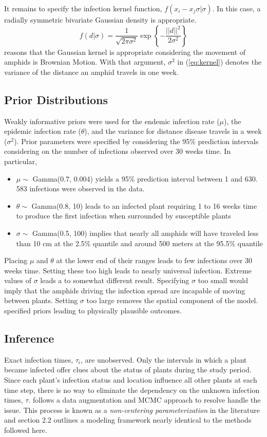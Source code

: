 \documentclass{uwstat572}
\begin{document}
It remains to specify the infection kernel function, $f(x_i -x_j \sigma | \sigma)$. In this case, a radially symmetric bivariate Gaussian density is appropriate. 
\begin{equation} f(d|\sigma) = \frac{1}{\sqrt{2\pi \sigma^2}} \exp \left\{-\frac{||d||^2}{2\sigma^2} \right\} \label{eq:kernel} \end{equation}
\cite{Brown} reasons that the Gaussian kernel is appropriate considering the movement of amphids is Brownian Motion. 
With that argument, $\sigma^2$ in (\ref{eq:kernel}) denotes the variance of the distance an amphid travels in one week. 

\subsection{Prior Distributions}
Weakly informative priors were used for the endemic infection rate ($\mu$), the epidemic infection rate ($\theta$), and the variance for distance disease travels in a week ($\sigma^2$). 
Prior parameters were specified by considering the 95\% prediction intervals considering on the number of infections observed over 30 weeks time.
In particular,  
\begin{itemize}
\item $\mu \sim$ Gamma(0.7, 0.004) yields a 95\% prediction interval between 1 and 630. 583 infections were observed in the data.
\item $\theta \sim$ Gamma(0.8, 10) leads to an infected plant requiring 1 to 16 weeks time to produce the first infection when surrounded by susceptible plants
\item $\sigma \sim$ Gamma(0.5, 100) implies that nearly all amphids will have traveled less than 10 cm at the 2.5\% quantile and around 500 meters at the 95.5\% quantile
\end{itemize}
Placing $\mu$ and $\theta$ at the lower end of their ranges leads to few infections over 30 weeks time. 
Setting these too high leads to nearly universal infection. 
Extreme values of $\sigma$ leads a to somewhat different result. 
Specifying $\sigma$ too small would imply that the amphids driving the infection spread are incapable of moving between plants. 
Setting $\sigma$ too large removes the spatial component of the model. 
\cite{Brown} specified priors leading to physically plausible outcomes. 


\subsection{Inference}
Exact infection times, $\tau_i$, are unobserved. 
Only the intervals in which a plant became infected offer clues about the status of plants during the study period. 
Since each plant's infection status and location influence all other plants at each time step, there is no way to eliminate the dependency on the unknown infection times, $\tau$.
\cite{Brown} follows a data augmentation and MCMC approach to resolve handle the issue. 
This process is known as a \textit{non-centering parameterization} in the literature and \cite{Jewell} section 2.2 outlines a modeling framework nearly identical to the methods followed here. 
\end{document}
